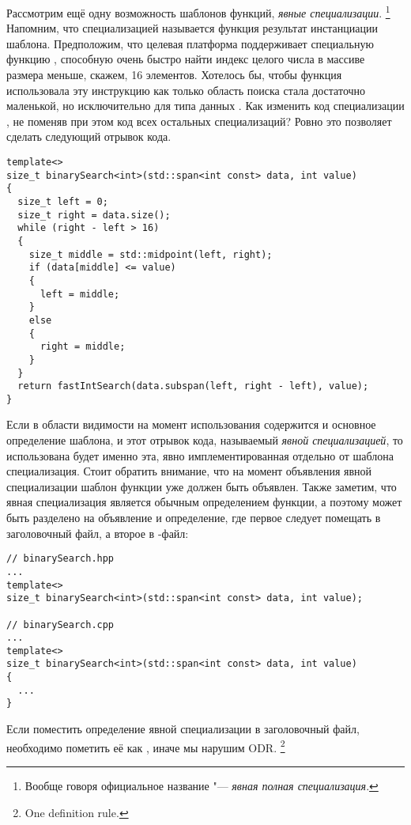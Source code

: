 Рассмотрим ещё одну возможность шаблонов функций, \textit{явные специализации}.
\footnote{Вообще говоря официальное название "--- \textit{явная полная специализация}.}
Напомним, что специализацией называется функция результат инстанциации шаблона.
Предположим, что целевая платформа поддерживает специальную функцию , способную очень быстро найти индекс целого числа в массиве размера меньше, скажем, 16 элементов.
Хотелось бы, чтобы функция  использовала эту инструкцию как только область поиска стала достаточно маленькой, но исключительно для типа данных .
Как изменить код специализации , не поменяв при этом код всех остальных специализаций? Ровно это позволяет сделать следующий отрывок кода.
\begin{verbatim}
template<>
size_t binarySearch<int>(std::span<int const> data, int value)
{
  size_t left = 0;
  size_t right = data.size();
  while (right - left > 16)
  {
    size_t middle = std::midpoint(left, right);
    if (data[middle] <= value)
    {
      left = middle;
    }
    else
    {
      right = middle;
    }
  }
  return fastIntSearch(data.subspan(left, right - left), value);
}
\end{verbatim}
Если в области видимости на момент использования  содержится и основное определение шаблона, и этот отрывок кода, называемый \textit{явной специализацией}, то использована будет именно эта, явно имплементированная отдельно от шаблона специализация.
Стоит обратить внимание, что на момент объявления явной специализации шаблон функции уже должен быть объявлен.
Также заметим, что явная специализация является обычным определением функции, а поэтому может быть разделено на объявление и определение, где первое следует помещать в заголовочный файл, а второе в -файл:
\begin{verbatim}
// binarySearch.hpp
...
template<>
size_t binarySearch<int>(std::span<int const> data, int value);

// binarySearch.cpp
...
template<>
size_t binarySearch<int>(std::span<int const> data, int value)
{
  ...
}
\end{verbatim}
Если поместить определение явной специализации в заголовочный файл, необходимо пометить её как , иначе мы нарушим ODR.
\footnote{One definition rule.}

